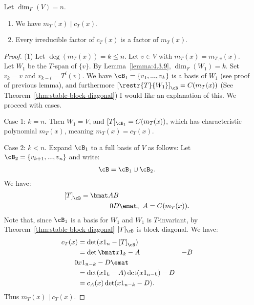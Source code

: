     \begin{theorem}
        Let $\dim_F(V) = n$.
        \begin{enumerate}[label = (\arabic*)]
            \item We have $m_T(x) \mid c_T(x)$.
            \item Every irreducible factor of $c_T(x)$ is a factor of $m_T(x)$.
        \end{enumerate}
    \end{theorem}
        \begin{proof}
            (1) Let $\deg(m_T(x)) = k \leq n$. Let $v \in V$ with $m_T(x) = m_{T,v}(x)$. Let $W_1$ be the $T$-span of $\{v\}$. By Lemma~\ref{lemma:4.3.9}, $\dim_F(W_1) = k$. Set $v_k = v$ and $v_{k-i} = T^i(v)$. We have $\cB_1 = \{v_1,...,v_k\}$ is a basis of $W_1$ (see proof of previous lemma), and furthermore $\left[\restr{T}{W_1}\right]_\cB = C(m_T(x))$ (See Theorem~\ref{thm:stable-block-diagonal}) {\color{red} I would like an explanation of this}. We proceed with cases.

            Case 1: $k = n$. Then $W_1 = V$, and $[T]_{\cB_1} = C(m_T(x))$, which has characteristic polynomial $m_T(x)$, meaning $m_T(x) = c_T(x)$.

            Case 2: $k < n$. Expand $\cB_1$ to a full basis of $V$ as follows: Let $\cB_2 = \{v_{k+1},...,v_n\}$ and write:
                \begin{equation*}
                \begin{split}
                    \cB = \cB_1 \cup \cB_2.
                \end{split}
                \end{equation*}
            We have:
                \begin{equation*}
                \begin{split}
                    \left[T\right]_\cB = \bmat A & B \\ 0 & D \emat, \hspace{4pt} A = C(m_T(x)).
                \end{split}
                \end{equation*}
            Note that, since $\cB_1$ is a basis for $W_1$ and $W_1$ is $T$-invariant, by Theorem~\ref{thm:stable-block-diagonal} $[T]_\cB$ is block diagonal. We have:
                \begin{equation*}
                \begin{split}
                    c_T(x)
                    & = \det(x1_n - \left[T\right]_\cB) \\
                    & = \det \bmat x1_k - A & -B \\ 0 & x1_{n-k}-D \emat \\
                    & = \det(x1_k - A)\det(x1_{n-k})-D \\
                    & = c_A(x)\det(x1_{n-k}-D).
                \end{split}
                \end{equation*}
            Thus $m_T(x) \mid c_T(x)$.


\end{proof}
